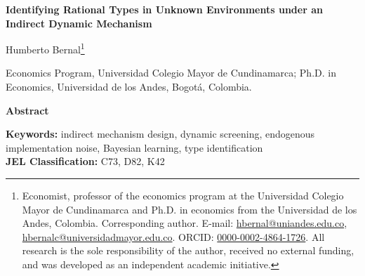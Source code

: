 \documentclass[12pt]{article}
\begin{document}
\begin{center}
    \singlespacing
    {\Large\bf Identifying Rational Types in Unknown Environments under an Indirect Dynamic Mechanism}
    
    \vspace{1.2cm}
    
    {\large Humberto Bernal\footnote{Economist, professor of the economics program at the Universidad Colegio Mayor de Cundinamarca and Ph.D. in economics from the Universidad de los Andes, Colombia. Corresponding author. E-mail: \href{mailto:hbernal@uniandes.edu.co}{hbernal@uniandes.edu.co}, \href{mailto:hbernalc@universidadmayor.edu.co}{hbernalc@universidadmayor.edu.co}. ORCID: \href{https://orcid.org/0000-0002-4864-1726}{0000-0002-4864-1726}. All research is the sole responsibility of the author, received no external funding, and was developed as an independent academic initiative.}}
    
    \vspace{0.4cm}
    
    {\small Economics Program, Universidad Colegio Mayor de Cundinamarca; Ph.D. in Economics, Universidad de los Andes, Bogot\'a, Colombia.}
    
    \vspace{1.2cm}
    
    \textbf{Abstract}
\end{center}

\begin{abstract}
This paper develops a dynamic indirect mechanism to identify rational types in unknown environments characterized by observational pooling. The central theoretical result, the Rational Type Identification Theorem, proves that the principal's Bayesian beliefs converge almost surely to the agent's true latent type along prolonged interactions without direct revelation reports. This asymptotic identification is operationalized by the Mano de Dios-Guadalupe process, an endogenous maximum-entropy noise kernel that ensures full support across actions within a competing-risks architecture. A complementary Implementability Theorem guarantees execution in Perfect Bayesian Equilibrium. Microeconometric calibration and deep-learning simulations of Colombian kidnapping validate rapid type separation and policy feasibility.
\end{abstract}

\vspace{0.8cm}

\noindent \textbf{Keywords:} indirect mechanism design, dynamic screening, endogenous implementation noise, Bayesian learning, type identification \\
\noindent \textbf{JEL Classification:} C73, D82, K42
\vspace{0.8cm}
\end{document}
